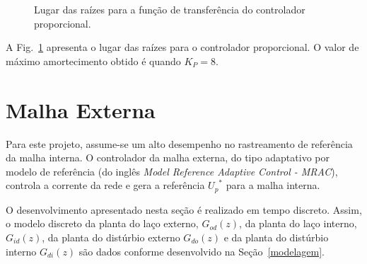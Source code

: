   \begin{figure}[htb]
    \centering{
      \def\svgwidth{\textwidth}
      }
    \renewcommand\figurename{Fig.}
    \caption{Lugar das raízes para a função de transferência do controlador proporcional.}
    \label{fig:rlocus_ic_2}
  \end{figure}

  A Fig.~\ref{fig:rlocus_ic_2} apresenta o lugar das raízes para o controlador proporcional. O valor de máximo amortecimento obtido é quando $K_P = 8$.


\section{Malha Externa}

  Para este projeto, assume-se um alto desempenho no rastreamento de referência da malha interna. O controlador da malha externa, do tipo adaptativo por modelo de referência (do inglês \emph{Model Reference Adaptive Control - MRAC}), controla a corrente da rede e gera a referência ${U_p}^*$ para a malha interna.

  O desenvolvimento apresentado nesta seção é realizado em tempo discreto. Assim, o modelo discreto da planta do laço externo, $G_{od}(z)$, da planta do laço interno, $G_{id}(z)$, da planta do distúrbio externo $G_{do}(z)$ e da planta do distúrbio interno $G_{di}(z)$ são dados conforme desenvolvido na Seção~\ref{modelagem}.


